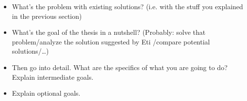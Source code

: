 \begin{itemize}
  \item What's the problem with existing solutions? (i.e. with the stuff you explained in the previous section)
  \item What's the goal of the thesis in a nutshell? (Probably: solve that problem/analyze the solution suggested by Eti \cite{testref}/compare potential solutions/\dots)
  \item Then go into detail. What are the specifics of what you are going to do? Explain intermediate goals.
  \item Explain optional goals.
\end{itemize}
